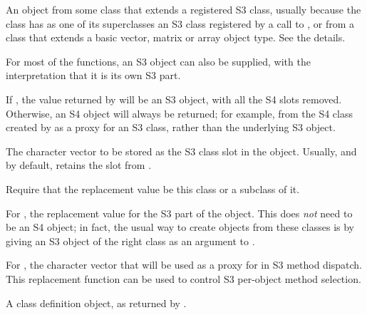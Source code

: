 \begin{Arguments}
\begin{ldescription}

\item[\code{object}]  An object from some class that extends a registered
S3 class,
usually because the class has as
one of its superclasses an S3 class registered by a call to
, or from a class that extends a basic
vector, matrix or array object type.  See the details.

For most of the functions, an S3 object can also be supplied,
with the interpretation that it is its own S3 part.

\item[\code{strictS3}]   If , the value returned by
 will be an S3 object, with all the S4 slots
removed.  Otherwise, an S4 object will always
be returned; for example, from the S4 class created by
 as a proxy for an S3 class, rather than
the underlying S3 object.

\item[\code{S3Class}]  The character vector to be stored as the S3 class
slot in the object.  Usually, and by default, retains
the slot from .


\item[\code{needClass}] Require that the replacement value be this class or a
subclass of it.


\item[\code{value}]  For , the replacement value for the S3 part of the object.
This does \emph{not} need to be an S4 object; in fact, the
usual way to create objects from these classes is by giving an
S3 object of the right class as an argument to
.

For , the character vector that will be used as
a proxy for  in S3 method dispatch.  This
replacement function can be used to control S3 per-object method
selection.



\item[\code{classDef}]  A class definition object, as returned by .



\end{ldescription}
\end{Arguments}
%
